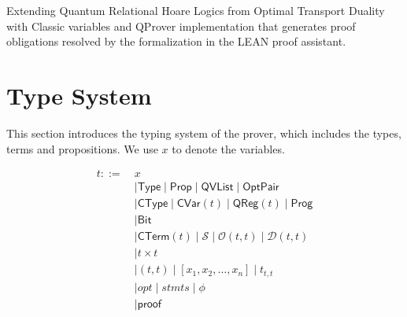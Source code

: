 
Extending Quantum Relational Hoare Logics from Optimal Transport Duality with Classic variables and QProver implementation that generates proof obligations resolved by the formalization in the LEAN proof assistant.



\section{Type System}
This section introduces the typing system of the prover, which includes the types, terms and propositions. We use $x$ to denote the variables.

\newcommand{\Type}{\textsf{Type}}
\newcommand{\CType}{\textsf{CType}}
\newcommand{\CTerm}[1]{\ensuremath{\textsf{CTerm}(#1)}}
\newcommand{\SType}{\ensuremath{\mathcal{S}}}

\newcommand{\cvar}[1]{\ensuremath{\textsf{CVar}(#1)}}
\newcommand{\qreg}[1]{\ensuremath{\textsf{QReg}(#1)}}
\newcommand{\qvlist}{\textsf{QVList}}
\newcommand{\opt}[2]{\ensuremath{\mathcal{O}(#1, #2)}}
\newcommand{\ldirac}[2]{\ensuremath{\mathcal{D}(#1, #2)}}

\newcommand{\optpair}{\ensuremath{\textsf{OptPair}}}
\newcommand{\unitary}[1]{\ensuremath{\textsf{Unitary}({#1})}}
\newcommand{\assn}[1]{\ensuremath{\textsf{Assn}(#1)}}
\newcommand{\meas}[1]{\ensuremath{\textsf{Meas}(#1)}}
\newcommand{\prog}{\ensuremath{\textsf{Prog}}}
\newcommand{\prop}{\ensuremath{\textsf{Prop}}}
\newcommand{\bit}{\textsf{Bit}}
\newcommand{\pf}{\textsf{proof}}
\newcommand{\judge}[4]{\ensuremath{\{#1\}~#2 \sim #3~\{#4\}}}

\begin{definition}
    \begin{align*}
        t ::=\ & x \\
        & \mid \Type \mid \prop \mid \qvlist \mid \optpair \\
        & \mid \CType \mid \cvar{t} \mid \qreg{t} \mid \prog \\
        & \mid \bit \\
        & \mid \CTerm{t} \mid \SType \mid \opt{t}{t} \mid \ldirac{t}{t} \\
        & \mid t \times t  \\ 
        & \mid (t, t) \mid [x_1, x_2, \dots, x_n] \mid t_{t,t} \\
        & \mid opt \mid stmts \mid \phi \\
        & \mid \pf
    \end{align*}
\end{definition}

